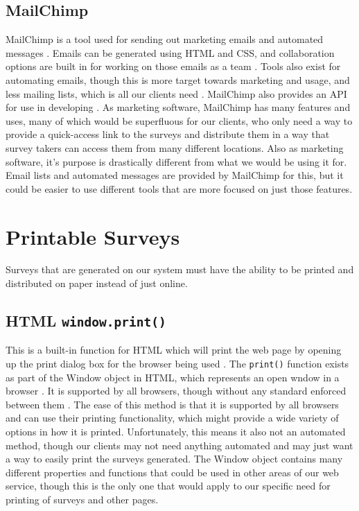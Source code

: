 \documentclass[letterpaper,10pt,serif, draftclsnofoot,onecolumn, compsoc, titlepage]{IEEEtran}
\begin{document}
\subsection{MailChimp}
MailChimp is a tool used for sending out marketing emails and automated messages \cite{mailchimp}.
Emails can be generated using HTML and CSS, and collaboration options are built in for working on those emails as a team \cite{mailchimp_features, mailchimp_email}.
Tools also exist for automating emails, though this is more target towards marketing and usage, and less mailing lists, which is all our clients need \cite{mailchimp_features}.
MailChimp also provides an API for use in developing \cite{mailchimp_features}.
As marketing software, MailChimp has many features and uses, many of which would be superfluous for our clients, who only need a way to provide a quick-access link to the surveys and distribute them in a way that survey takers can access them from many different locations.
Also as marketing software, it's purpose is drastically different from what we would be using it for.
Email lists and automated messages are provided by MailChimp for this, but it could be easier to use different tools that are more focused on just those features.

\section{Printable Surveys}
Surveys that are generated on our system must have the ability to be printed and distributed on paper instead of just online.
\subsection{HTML \texttt{window.print()}}
This is a built-in function for HTML which will print the web page by opening up the print dialog box for the browser being used \cite{window_print}.
The \texttt{print()} function exists as part of the Window object in HTML, which represents an open wndow in a browser \cite{window}.
It is supported by all browsers, though without any standard enforced between them \cite{window}.
The ease of this method is that it is supported by all browsers and can use their printing functionality, which might provide a wide variety of options in how it is printed.
Unfortunately, this means it also not an automated method, though our clients may not need anything automated and may just want a way to easily print the surveys generated.
The Window object contains many different properties and functions that could be used in other areas of our web service, though this is the only one that would apply to our specific need for printing of surveys and other pages.
\end{document}
